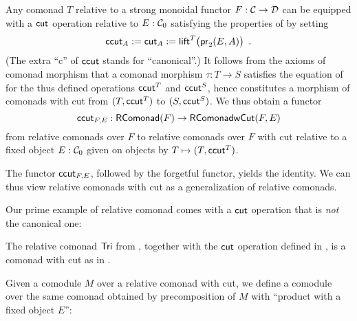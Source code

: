 \documentclass{amsart}
\begin{document}
\begin{remark}\label{canonical_cut}
 Any comonad $T$ relative to a strong monoidal functor $F:{\mathcal{C}}\to\mathcal{D}$  can be equipped with a $\mathsf{cut}$ operation relative to 
 $E:{\mathcal{C}}_0$ satisfying the properties of  by setting
   \[ \mathsf{ccut}_A := \mathsf{cut}_A := \mathsf{lift}^T\bigl(\mathsf{pr}_2(E,A)\bigr) \enspace . \]
 (The extra \enquote{c} of $\mathsf{ccut}$ stands for \enquote{canonical}.)
 It follows from the axioms of comonad morphism that a comonad morphism $\tau : T\to S$ satisfies the equation of  
 for the thus defined operations $\mathsf{ccut}^T$ and $\mathsf{ccut}^S$, hence constitutes a morphism of comonads with cut from $(T,\mathsf{ccut}^T)$ to $(S,\mathsf{ccut}^S)$.
 We thus obtain a functor 
 \[ \mathsf{ccut}_{F,E} : \mathsf{RComonad}(F) \to \mathsf{\mathsf{RComonad} wCut}(F,E)\]
 from relative comonads over $F$ to relative comonads over $F$ with cut relative to a fixed object $E:{\mathcal{C}}_0$ given on 
 objects by $T\mapsto (T,\mathsf{ccut}^T)$.
\end{remark}

The functor $\mathsf{ccut}_{F,E}$, followed by the forgetful functor, yields the identity. We can thus view
relative comonads with cut as a generalization of relative comonads.


Our prime example of relative comonad comes with a $\mathsf{cut}$ operation that is \emph{not} the canonical one:

\begin{example}\label{def:cut_for_tri}
  The relative comonad $\mathsf{Tri}$ from , together with the $\mathsf{cut}$ operation defined in , 
  is a comonad with cut as in .
\end{example}





Given a comodule $M$ over a relative comonad with cut, we define a comodule over the same comonad obtained by precomposition of $M$ with
\enquote{product with a fixed object $E$}:
\end{document}
